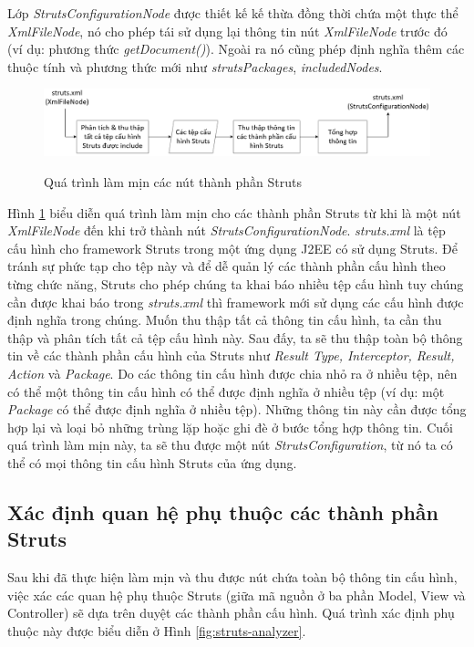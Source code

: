 \documentclass[12pt]{report}
\begin{document}
Lớp \textit{StrutsConfigurationNode} được thiết kế kế thừa đồng thời chứa một thực thể \textit{XmlFileNode}, nó cho phép tái sử dụng lại thông tin nút \textit{XmlFileNode} trước đó (ví dụ: phương thức \textit{getDocument()}). Ngoài ra nó cũng phép định nghĩa thêm các thuộc tính và phương thức mới như \textit{strutsPackages}, \textit{includedNodes}.

\begin{figure}[h]
	\centering
	\includegraphics[scale=0.5]{lam-min-process}
	\label{fig:lam-min-process}
	\caption{Quá trình làm mịn các nút thành phần Struts}
\end{figure}

Hình \ref{fig:lam-min-process} biểu diễn quá trình làm mịn cho các thành phần Struts từ khi là một nút \textit{XmlFileNode} đến khi trở thành nút \textit{StrutsConfigurationNode}. \textit{struts.xml} là tệp cấu hình cho framework Struts trong một ứng dụng J2EE có sử dụng Struts. Để tránh sự phức tạp cho tệp này và để dễ quản lý các thành phần cấu hình theo từng chức năng, Struts cho phép chúng ta khai báo nhiều tệp cấu hình tuy chúng cần được khai báo trong \textit{struts.xml} thì framework mới sử dụng các cấu hình được định nghĩa trong chúng. Muốn thu thập tất cả thông tin cấu hình, ta cần thu thập và phân tích tất cả tệp cấu hình này. Sau đấy, ta sẽ thu thập toàn bộ thông tin về các thành phần cấu hình của Struts như \textit{Result Type, Interceptor, Result, Action} và \textit{Package}. Do các thông tin cấu hình được chia nhỏ ra ở nhiều tệp, nên có thể một thông tin cấu hình có thể được định nghĩa ở nhiều tệp (ví dụ: một \textit{Package} có thể được định nghĩa ở nhiều tệp). Những thông tin này cần được tổng hợp lại và loại bỏ những trùng lặp hoặc ghi đè ở bước tổng hợp thông tin. Cuối quá trình làm mịn này, ta sẽ thu được một nút \textit{StrutsConfiguration}, từ nó ta có thể có mọi thông tin cấu hình Struts của ứng dụng.

\subsection{Xác định quan hệ phụ thuộc các thành phần Struts}
Sau khi đã thực hiện làm mịn và thu được nút chứa toàn bộ thông tin cấu hình, việc xác các quan hệ phụ thuộc Struts (giữa mã nguồn ở ba phần Model, View và Controller) sẽ dựa trên duyệt các thành phần cấu hình. Quá trình xác định phụ thuộc này được biểu diễn ở Hình \ref{fig:struts-analyzer}.
\end{document}
